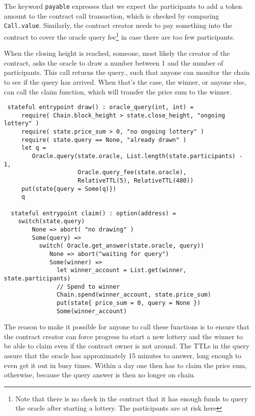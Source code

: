 The keyword \verb+payable+ expresses that we expect the participants
to add a token amount to the contract call transaction, which is
checked by comparing \verb+Call.value+. Similarly, the contract
creator needs to pay something into the contract to cover the oracle query
fee\footnote{Note that there is no check in the contract that it has
  enough funds to query the oracle after starting a lottery. The
  participants are at risk here} in case there are too few
participants.

When the closing height is reached, someone, most likely the creator
of the contract, asks the oracle to draw a number between 1 and the
number of participants. This call returns the query., such that anyone
can monitor the chain to see if the query has arrived. When that's the
case, the winner, or anyone else, can call the claim function, which
will transfer the price sum to the winner.
\begin{verbatim}
 stateful entrypoint draw() : oracle_query(int, int) =
     require( Chain.block_height > state.close_height, "ongoing lottery" )
     require( state.price_sum > 0, "no ongoing lottery" )
     require( state.query == None, "already drawn" )
     let q =
        Oracle.query(state.oracle, List.length(state.participants) - 1,
                     Oracle.query_fee(state.oracle),
                     RelativeTTL(5), RelativeTTL(480))
     put(state{query = Some(q)})
     q

  stateful entrypoint claim() : option(address) =
    switch(state.query)
        None => abort( "no drawing" )
        Some(query) =>
          switch( Oracle.get_answer(state.oracle, query))
             None => abort("waiting for query")
             Some(winner) =>
               let winner_account = List.get(winner, state.participants)
               // Spend to winner
               Chain.spend(winner_account, state.price_sum)
               put(state{ price_sum = 0, query = None })
               Some(winner_account)
\end{verbatim}

The reason to make it possible for anyone to call these functions is
to ensure that the contract creator can force progress to start a new
lottery and the winner to be able to claim even if the contract owner
is not around. The TTLs in the query assure that the oracle has
approximately 15 minutes to answer, long enough to even get it out
in busy times. Within a day one then has to claim the price sum,
otherwise, because the query answer is then no longer on chain.

